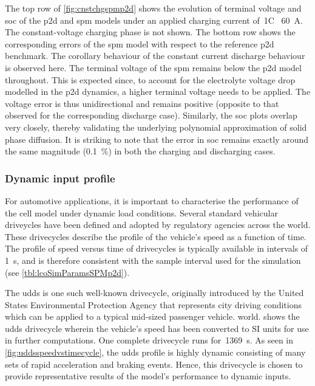 The top row of \cref{fig:cnstchgspmp2d}  shows the evolution of terminal voltage
and \gls{soc}  of the \gls{p2d} and  \gls{spm} models under an  applied charging
current of~1C  \ie~\SI{60}{\ampere}. The constant-voltage charging  phase is not
shown. The bottom row shows the corresponding errors of the \gls{spm} model with
respect to  the reference  \gls{p2d} benchmark. The  corollary behaviour  of the
constant current discharge  behaviour is observed here. The  terminal voltage of
the \gls{spm}  remains below  the \gls{p2d} model  throughout. This  is expected
since, to  account for the  electrolyte voltage  drop modelled in  the \gls{p2d}
dynamics, a  higher terminal voltage needs  to be applied. The  voltage error is
thus  unidirectional and  remains positive  (opposite to  that observed  for the
corresponding  discharge  case). Similarly,  the  \gls{soc}  plots overlap  very
closely,  thereby validating  the underlying  polynomial approximation  of solid
phase diffusion.  It is  striking to  note that the  error in  \gls{soc} remains
exactly  around  the  same  magnitude (\approx\SI{0.1}{\percent})  in  both  the
charging and discharging cases.

\subsubsection*{Dynamic input profile}\label{subsubsec:dynamicspmp2dsim}

For automotive applications, it is  important to characterise the performance of
the  cell  model  under  dynamic load  conditions.  Several  standard  vehicular
driveycles  have been  defined and  adopted  by regulatory  agencies across  the
world.  These drivecycles  describe  the profile  of the  vehicle's  speed as  a
function of time.  The profile of speed versus time  of drivecycles is typically
available in intervals of \SI{1}{\second},  and is therefore consistent with the
sample interval used for the simulation (see \cref{tbl:lcoSimParamsSPMp2d}).

The \gls{udds} is  one such well-known drivecycle, originally  introduced by the
United  States  Environmental Protection  Agency  that  represents city  driving
conditions  which can  be  applied  to a  typical  mid-sized passenger  vehicle.
world.   shows the \gls{udds}  drivecycle wherein
the  vehicle's  speed  has  been  converted  to SI  units  for  use  in  further
computations.  One  complete  drivecycle runs  for~\SI{1369}{\second}.  As  seen
in  \cref{fig:uddsspeedvstimecycle}, the  \gls{udds} profile  is highly  dynamic
consisting  of  many sets  of  rapid  acceleration  and braking  events.  Hence,
this  drivecycle is  chosen to  provide  representative results  of the  model's
performance to dynamic inputs.

